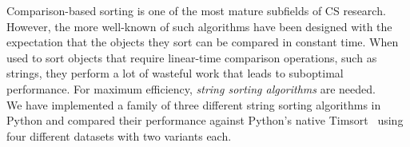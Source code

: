 \begin{multicols}{2}
\sffamily
\small 
Comparison-based sorting is one of the most mature subfields of CS research.
However, the more well-known of such algorithms have been designed with the
expectation that the objects they sort can be compared in constant time.
When used to sort objects that require linear-time comparison operations,
such as strings, they perform a lot of wasteful work that leads to suboptimal
performance. For maximum efficiency, \emph{string sorting algorithms} are
needed.\\

We have implemented a family of three different string sorting algorithms in
Python and compared their performance against Python's native Timsort~\cite{p2002} using
four different datasets with two variants each.\\
\end{multicols}